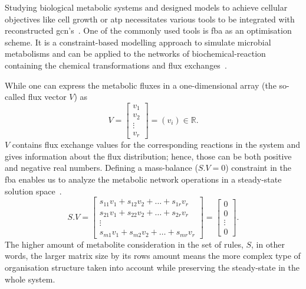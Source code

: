 Studying biological metabolic systems and designed models to achieve cellular objectives like cell growth or \acf{atp} necessitates various tools to be integrated with reconstructed \acs{gcn}'s~\cite{KIM, HAO}. One of the commonly used tools is \acf{fba} as an optimisation scheme. It is a constraint-based modelling approach to simulate microbial metabolisms and can be applied to the networks of biochemical-reaction containing the chemical transformations and flux exchanges~\cite{KAUFFMAN2003491, PRICE2004}.

While one can express the metabolic fluxes in a one-dimensional array (the so-called flux vector $V$) as
\begin{equation} %
	V = \begin{bmatrix}
		v_{1} \\
		v_{2} \\
		\vdots \\
		v_{r}
	\end{bmatrix}=(v_{i})\in \mathbb{R}.
	\label{solutionvector}
\end{equation}
$V$ contains flux exchange values for the corresponding reactions in the system and gives information about the flux distribution; hence, those can be both positive and negative real numbers. Defining a mass-balance ($S.V=0$) constraint in the \acs{fba} enables us to analyze the metabolic network operations in a steady-state solution space~\cite{KAUFFMAN2003491,PRICE2004}.
\begin{equation} %
	S.V = \begin{bmatrix} 
		s_{11}v_{1} + s_{12}v_{2} + \dots + s_{1r}v_{r} \\
		s_{21}v_{1} + s_{22}v_{2} + \dots + s_{2r}v_{r} \\
		\vdots \\
		s_{m1}v_{1} + s_{m2}v_{2} + \dots + s_{mr}v_{r} 
	\end{bmatrix}=
	\begin{bmatrix} 
		0 \\
		0 \\
		\vdots \\
		0
	\end{bmatrix}.
	\label{massbalanceconstraint}
\end{equation}
The higher amount of metabolite consideration in the set of rules, $S$, in other words, the larger matrix size by its rows amount means the more complex type of organisation structure taken into account while preserving the steady-state in the whole system.

